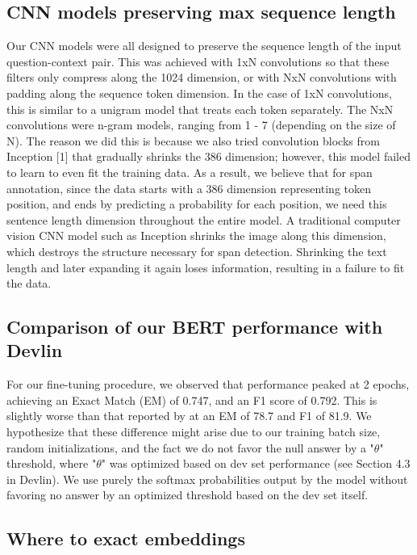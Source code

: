 \subsection{CNN models preserving max sequence length}
\label{apdx:cnn_models_preserving_seq_length}

Our CNN models were all designed to preserve the sequence length of the input question-context pair. This was achieved with 1xN convolutions so that these filters only compress along the 1024 dimension, or with NxN convolutions with padding along the sequence token dimension. In the case of 1xN convolutions, this is similar to a unigram model that treats each token separately. The NxN convolutions were n-gram models, ranging from 1 - 7 (depending on the size of N). The reason we did this is because we also tried convolution blocks from Inception [1] that gradually shrinks the 386 dimension; however, this model failed to learn to even fit the training data. As a result, we believe that for span annotation, since the data starts with a 386 dimension representing token position, and ends by predicting a probability for each position, we need this sentence length dimension throughout the entire model. A traditional computer vision CNN model such as Inception shrinks the image along this dimension, which destroys the structure necessary for span detection. Shrinking the text length and later expanding it again loses information, resulting in a failure to fit the data.

\subsection{Comparison of our BERT performance with Devlin}
\label{apdx:comparison_with_devlin}

For our fine-tuning procedure, we observed that performance peaked at 2 epochs, achieving an Exact Match (EM) of 0.747, and an F1 score of 0.792. This is slightly worse than that reported by \cite{Devlin2019} at an EM of 78.7 and F1 of 81.9. We hypothesize that these difference might arise due to our training batch size, random initializations, and the fact we do not favor the null answer by a "$\theta$" threshold, where "$\theta$" was optimized based on dev set performance (see Section 4.3 in Devlin). We use purely the softmax probabilities output by the model without favoring no answer by an optimized threshold based on the dev set itself.

\subsection{Where to exact embeddings}
\label{apdx:where_to_extract_embeddings}

